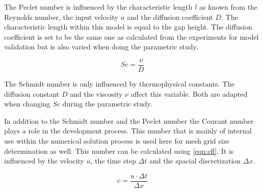 \documentclass[../thesis.tex]{subfiles}
\begin{document}
The Peclet number is influenced by the characteristic length $l$ as known from the Reynolds number, the input velocity $u$ and the diffusion coefficient $D$. The characteristic length within this model is equal to the gap height. The diffusion coefficient is set to be the same one as calculated from the experiments for model validation but is also varied when doing the parametric study.

\begin{equation}
	\label{eqn: Sc}
	Sc = \dfrac{\nu}{D}
\end{equation}

The Schmidt number is only influenced by thermophysical constants. The diffusion constant $D$ and the viscosity $\nu$ affect this variable. Both are adapted when changing $Sc$ during the parametric study.

In addition to the Schmidt number and the Peclet number the Courant number plays a role in the development process. This number that is mainly of internal use within the numerical solution process is used here for mesh grid size determination as well. This number can be calculated using \autoref{eqn:cfl}. It is influenced by the velocity $u$, the time step $ \Delta t$ and the spacial discretization $\Delta x$.

\begin{equation}
	\label{eqn:cfl}
	c = \dfrac{u \cdot \Delta t}{\Delta x}
\end{equation}
\end{document}
